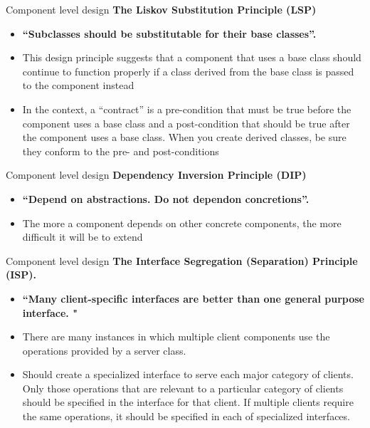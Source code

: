 \documentclass{beamer}
\begin{document}
\begin{frame}{Component level design }
	\textbf{The Liskov Substitution Principle (LSP)}
	\begin{itemize}
		\item \textbf{“Subclasses should be 
			substitutable for their base classes”.} 
		\item This design principle suggests that a component that uses a base class should 
		continue to function properly if a class derived from the base class is passed
		to the component instead
		\item In the context, a “contract” is a pre-condition that must be true before the 
		component uses a base class and a post-condition that should be true after 
		the component uses a base class. When you create derived classes, be sure
		they conform to the pre- and post-conditions
		
	\end{itemize}	
\end{frame}
\begin{frame}{Component level design }
	\textbf{Dependency Inversion Principle (DIP)}
		\begin{itemize}
			\item \textbf{“Depend on abstractions. Do not dependon concretions”. }
			\item The more a component depends on 
			other concrete components, the more difficult it will be to extend
		\end{itemize}
\end{frame}
\begin{frame}{Component level design }
	\textbf{The Interface Segregation (Separation) Principle (ISP).}
	\begin{itemize}
		\item \textbf{“Many client-specific interfaces are better than one general purpose interface. "}
		\item There are many instances in which multiple client components use the 
		operations provided by a server class.
		\item Should create a specialized interface to serve each major category of 
		clients. Only those operations that are relevant to a particular category of 
		clients should be specified in the interface for that client. If multiple clients 
		require the same operations, it should be specified in each of specialized
		interfaces.
	\end{itemize}
\end{frame}
\end{document}
